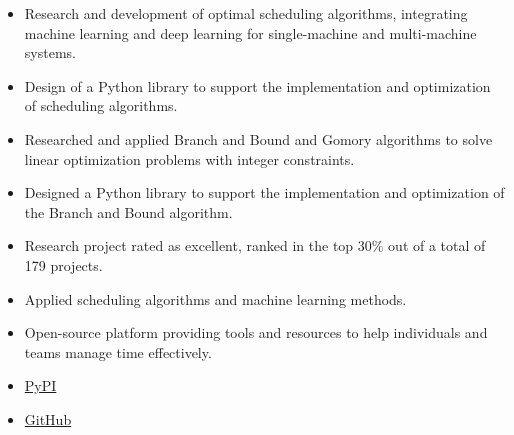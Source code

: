 \documentclass[10pt,a4paper,ragged2e,withhyper]{altacv}
\begin{document}


\makecvheader


\begin{paracol}{2}


\begin{itemize}
\item Research and development of optimal scheduling algorithms, integrating machine learning and deep learning for single-machine and multi-machine systems.
\item Design of a Python library to support the implementation and optimization of scheduling algorithms.
\end{itemize}


\divider


\begin{itemize}
\item Researched and applied Branch and Bound and Gomory algorithms to solve linear optimization problems with integer constraints.
\item Designed a Python library to support the implementation and optimization of the Branch and Bound algorithm.
\item Research project rated as excellent, ranked in the top 30\% out of a total of 179 projects.
\end{itemize}



\begin{itemize}
\item Applied scheduling algorithms and machine learning methods.
\item Open-source platform providing tools and resources to help individuals and teams manage time effectively.
\item \href{https://pypi.org/project/TiLearn/}{PyPI} \faPython
\item \href{https://github.com/Bancie/TiLearn}{GitHub} \faGithubSquare
\end{itemize}


\end{paracol}
\end{document}
